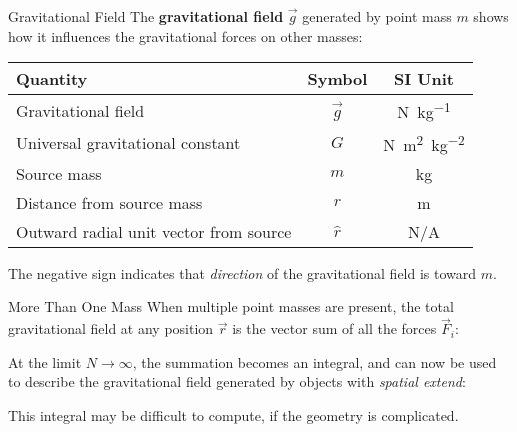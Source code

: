 \documentclass[12pt,compress,aspectratio=169]{beamer}
\begin{document}
\begin{frame}{Gravitational Field}
  The \textbf{gravitational field} $\vec g$ generated by point mass $m$
  shows how it influences the gravitational forces on other masses:

  \begin{center}
    \begin{tabular}{l|c|c}
      \rowcolor{pink}
      \textbf{Quantity} & \textbf{Symbol} & \textbf{SI Unit} \\ \hline
      Gravitational field       & $\vec g$ & \si{\newton\per\kilo\gram}\\
      Universal gravitational constant
      & $G$ & \si{\newton\metre\squared\per\kilo\gram\squared} \\
      Source mass               & $m$ & \si{\kilo\gram} \\
      Distance from source mass & $r$ & \si\metre \\
      Outward radial unit vector from source & $\hat r$ & N/A
    \end{tabular}
  \end{center}
  The negative sign indicates that \emph{direction} of the gravitational field
  is toward $m$.
\end{frame}



\begin{frame}{More Than One Mass}
  When multiple point masses are present, the total gravitational field at any
  position $\vec r$ is the vector sum of all the forces $\vec F_i$:
    

  At the limit $N\rightarrow\infty$, the summation becomes an integral, and can
  now be used to describe the gravitational field generated by objects with
  \emph{spatial extend}:

  
  This integral may be difficult to compute, if the geometry is complicated.
\end{frame}
\end{document}
